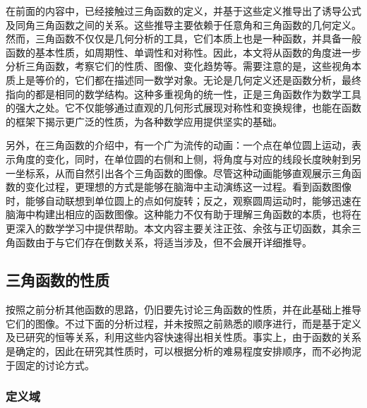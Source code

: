 
\begin{issues}
\issueDraft
\end{issues}


在前面的内容中，已经接触过三角函数的定义，并基于这些定义推导出了诱导公式及同角三角函数之间的关系。这些推导主要依赖于任意角和三角函数的几何定义。然而，三角函数不仅仅是几何分析的工具，它们本质上也是一种函数，并具备一般函数的基本性质，如周期性、单调性和对称性。因此，本文将从函数的角度进一步分析三角函数，考察它们的性质、图像、变化趋势等。需要注意的是，这些视角本质上是等价的，它们都在描述同一数学对象。无论是几何定义还是函数分析，最终指向的都是相同的数学结构。这种多重视角的统一性，正是三角函数作为数学工具的强大之处。它不仅能够通过直观的几何形式展现对称性和变换规律，也能在函数的框架下揭示更广泛的性质，为各种数学应用提供坚实的基础。

另外，在三角函数的介绍中，有一个广为流传的动画：一个点在单位圆上运动，表示角度的变化，同时，在单位圆的右侧和上侧，将角度与对应的线段长度映射到另一坐标系，从而自然引出各个三角函数的图像。尽管这种动画能够直观展示三角函数的变化过程，更理想的方式是能够在脑海中主动演练这一过程。看到函数图像时，能够自动联想到单位圆上的点如何旋转；反之，观察圆周运动时，能够迅速在脑海中构建出相应的函数图像。这种能力不仅有助于理解三角函数的本质，也将在更深入的数学学习中提供帮助。本文内容主要关注正弦、余弦与正切函数，其余三角函数由于与它们存在倒数关系，将适当涉及，但不会展开详细推导。

\subsection{三角函数的性质}

按照之前分析其他函数的思路，仍旧要先讨论三角函数的性质，并在此基础上推导它们的图像。不过下面的分析过程，并未按照之前熟悉的顺序进行，而是基于定义及已研究的恒等关系，利用这些内容快速得出相关性质。事实上，由于函数的关系是确定的，因此在研究其性质时，可以根据分析的难易程度安排顺序，而不必拘泥于固定的讨论方式。

\subsubsection{定义域}

